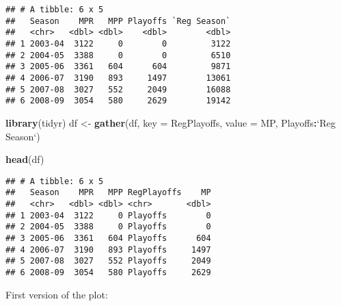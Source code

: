 \documentclass[]{book}
\newenvironment{Shaded}{\begin{snugshade}}{\end{snugshade}}
\newcommand{\DataTypeTok}[1]{\textcolor[rgb]{0.13,0.29,0.53}{#1}}
\newcommand{\KeywordTok}[1]{\textcolor[rgb]{0.13,0.29,0.53}{\textbf{#1}}}
\newcommand{\NormalTok}[1]{#1}
\newcommand{\OperatorTok}[1]{\textcolor[rgb]{0.81,0.36,0.00}{\textbf{#1}}}
\newcommand{\StringTok}[1]{\textcolor[rgb]{0.31,0.60,0.02}{#1}}
\begin{document}
\begin{verbatim}
## # A tibble: 6 x 5
##   Season    MPR   MPP Playoffs `Reg Season`
##   <chr>   <dbl> <dbl>    <dbl>        <dbl>
## 1 2003-04  3122     0        0         3122
## 2 2004-05  3388     0        0         6510
## 3 2005-06  3361   604      604         9871
## 4 2006-07  3190   893     1497        13061
## 5 2007-08  3027   552     2049        16088
## 6 2008-09  3054   580     2629        19142
\end{verbatim}

\begin{Shaded}
\begin{Highlighting}[]
\KeywordTok{library}\NormalTok{(tidyr)}
\NormalTok{df <-}\StringTok{ }\KeywordTok{gather}\NormalTok{(df, }\DataTypeTok{key =}\NormalTok{ RegPlayoffs, }\DataTypeTok{value =}\NormalTok{ MP, Playoffs}\OperatorTok{:}\StringTok{`}\DataTypeTok{Reg Season}\StringTok{`}\NormalTok{) }

\KeywordTok{head}\NormalTok{(df)}
\end{Highlighting}
\end{Shaded}

\begin{verbatim}
## # A tibble: 6 x 5
##   Season    MPR   MPP RegPlayoffs    MP
##   <chr>   <dbl> <dbl> <chr>       <dbl>
## 1 2003-04  3122     0 Playoffs        0
## 2 2004-05  3388     0 Playoffs        0
## 3 2005-06  3361   604 Playoffs      604
## 4 2006-07  3190   893 Playoffs     1497
## 5 2007-08  3027   552 Playoffs     2049
## 6 2008-09  3054   580 Playoffs     2629
\end{verbatim}

First version of the plot:
\end{document}
